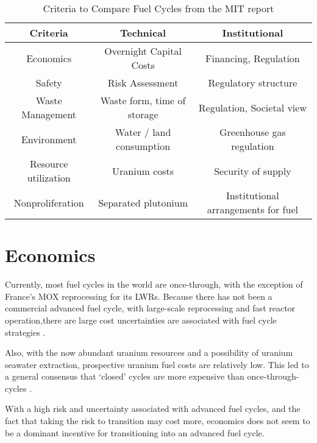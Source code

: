 \begin{table}[h]
    \centering
    \label{tab:mit}
    \caption{Criteria to Compare Fuel Cycles from the MIT report \cite{kazimi_future_2011}}
    \begin{tabular}{ccc}
        \hline
        \textbf{Criteria} & \textbf{Technical} & \textbf{Institutional}\\ \hline
        Economics & Overnight Capital Costs & Financing, Regulation \\
        Safety & Risk Assessment & Regulatory structure \\
        Waste Management & Waste form, time of storage & Regulation, Societal view \\
        Environment & Water / land consumption & Greenhouse gas regulation \\
        Resource utilization & Uranium costs & Security of supply \\
        Nonproliferation & Separated plutonium & Institutional arrangements for fuel \\
        \hline
    \end{tabular}
\end{table}


\section{Economics}
Currently, most fuel cycles in the world are once-through,
with the exception of France's \gls{MOX} reprocessing for its
\glspl{LWR}. Because there has not been a commercial advanced
fuel cycle, with large-scale reprocessing and fast reactor
operation,there are large cost uncertainties are associated
with fuel cycle strategies \cite{d._e._shropshire_advanced_2009}.

Also, with the now abundant uranium resources and a possibility
of uranium seawater extraction, prospective uranium fuel costs are relatively
low. This led to a general consensus that `closed' cycles are
more expensive than once-through-cycles
\cite{d._e._shropshire_advanced_2009, bunn_economics_2004, charpin_economic_2000}.

With a high risk and uncertainty associated with advanced fuel cycles,
and the fact that taking the risk to transition may cost more,
economics does not seem to be a dominant incentive for transitioning
into an advanced fuel cycle. 
